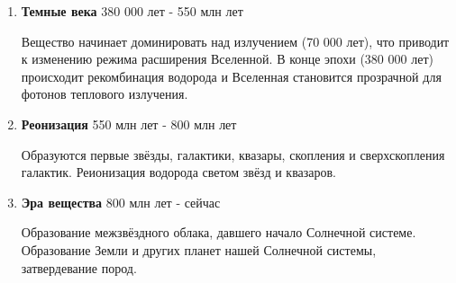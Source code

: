 \documentclass[a4paper, 12pt]{article}
\begin{document}
\begin{enumerate}
\item \textbf{Темные века} 380 000 лет - 550 млн лет

Вещество начинает доминировать над излучением (70 000 лет), что приводит к изменению режима расширения Вселенной. В конце эпохи (380 000 лет) происходит рекомбинация водорода и Вселенная становится прозрачной для фотонов теплового излучения.

\item \textbf{Реонизация} 550 млн лет - 800 млн лет

Образуются первые звёзды, галактики, квазары, скопления и сверхскопления галактик. Реионизация водорода светом звёзд и квазаров.

\item \textbf{Эра вещества} 800 млн лет - сейчас

Образование межзвёздного облака, давшего начало Солнечной системе. Образование Земли и других планет нашей Солнечной системы, затвердевание пород.
\end{enumerate}
\end{document}
